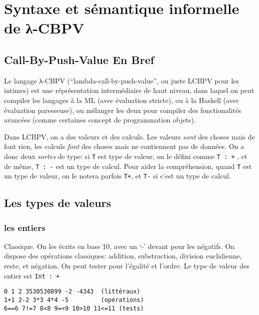 \documentclass[
]{article}
\author{}
\date{}
\begin{document}
\hypertarget{syntaxe-et-suxe9mantique-informelle-de-ux3bb-cbpv}{%
\section{Syntaxe et sémantique informelle de
λ-CBPV}\label{syntaxe-et-suxe9mantique-informelle-de-ux3bb-cbpv}}

\hypertarget{call-by-push-value-en-bref}{%
\subsection{Call-By-Push-Value En
Bref}\label{call-by-push-value-en-bref}}

Le langage λ-CBPV (``lambda-call-by-push-value'', ou juste LCBPV pour
les intimes) est une réprésentation intermédiaire de haut niveau, dans
laquel on peut compiler les langages à la ML (avec évaluation stricte),
ou à la Haskell (avec évaluation paresseuse), ou mélanger les deux pour
compiler des fonctionalités avancées (comme certaines concept de
programmation objets).

Dans LCBPV, on a des valeurs et des calculs. Les valeurs \emph{sont} des
choses mais de font rien, les calculs \emph{font} des choses mais ne
contiennent pas de données. On a donc deux \emph{sortes} de type: si
\texttt{T} est type de valeur, on le défini comme \texttt{T\ :\ +} , et
de même, \texttt{T\ :\ -} est un type de calcul. Pour aider la
compréhension, quand \texttt{T} est un type de valeur, on le notera
parfois \texttt{T+}, et \texttt{T-} si c'est un type de calcul.

\hypertarget{les-types-de-valeurs}{%
\subsection{Les types de valeurs}\label{les-types-de-valeurs}}

\hypertarget{les-entiers}{%
\subsubsection{les entiers}\label{les-entiers}}

Classique. On les écrits en base 10, avec un `-' devant pour les
négatifs. On dispose des opérations classiques: addition, substraction,
division euclidienne, reste, et négation. On peut tester pour l'égalité
et l'ordre. Le type de valeur des entier est \texttt{Int\ :\ +}

\begin{verbatim}
0 1 2 3530530899 -2 -4343  (littéraux)
1+1 2-2 3*3 4*4 -5         (opérations)
6==6 7!=7 8<8 9=<9 10>10 11<=11 (tests)
\end{verbatim}
\end{document}
